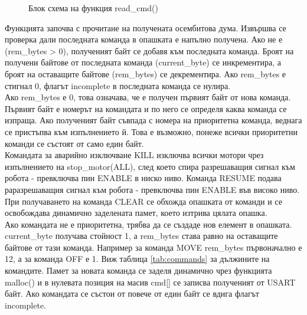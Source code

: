 \begin{figure}
    \caption{Блок схема на функция read\_cmd()}
    \label{fig:read_cmd}
\end{figure}
Функцията започва с прочитане на получената осембитова дума. Извършва се проверка дали последната команда в опашката е напълно получена. Ако не е (rem\_bytes > 0), полученият байт се добавя към последната команда. Броят на получени байтове от последната команда (current\_byte) се инкрементира, а броят на оставащите байтове (rem\_bytes) се декрементира. Ако rem\_bytes е стигнал 0, флагът incomplete в последната команда се нулира.\\
\indent{}
Ако rem\_bytes е 0, това означава, че е получен първият байт от нова команда. Първият байт е номерът на командата и по него се определя каква команда се изпраща. Ако полученият байт съвпада с номера на приоритетна команда, веднага се пристъпва към изпълнението й. Това е възможно, понеже всички приоритетни команди се състоят от само един байт.\\
\indent{}
Командата за аварийно изключване KILL изключва всички мотори чрез изпълнението на stop\_motor(ALL), след което спира разрешаващия сигнал към робота - превключва пин ENABLE в ниско ниво. Команда RESUME подава раразрешаващия сигнал към робота - превключва пин ENABLE във високо ниво. При получаването на команда CLEAR се обхожда опашката от команди и се освобождава динамично заделената памет, което изтрива цялата опашка.\\
\indent{}
Ако командата не е приоритетна, трябва да се създаде нов елемент в опашката. current\_byte получава стойност 1, а rem\_bytes става равно на оставащите байтове от тази команда. Например за команда MOVE rem\_bytes първоначално е 12, а за команда OFF е 1. Виж таблица \ref{tab:commands} за дължините на командите. Памет за новата команда се заделя динамично чрез функцията malloc() и в нулевата позиция на масив cmd[] се записва полученият от USART байт. Ако командата се състои от повече от един байт се вдига флагът incomplete.
